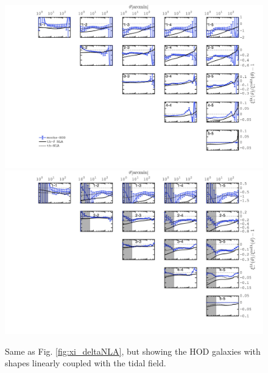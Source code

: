 \begin{figure}
\includegraphics[width=\columnwidth]{graphs/frac_xip_sims_HOD.jpg}
\includegraphics[width=\columnwidth]{graphs/frac_xim_sims_HOD.jpg}
\caption{Same as Fig. \ref{fig:xi_deltaNLA}, but showing the HOD galaxies with shapes linearly coupled with the tidal field. }
\label{fig:xi_hod_nla}
\end{figure}